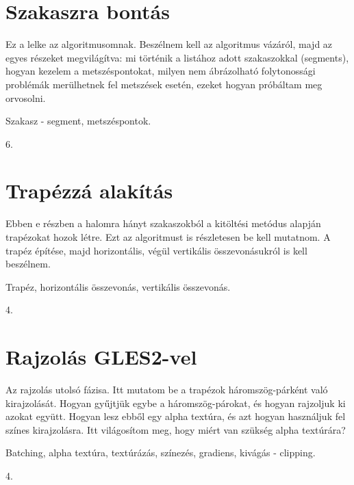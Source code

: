 \documentclass[12pt]{report}
\theoremstyle{definition}
\begin{document}
  \section{Szakaszra bontás}

Ez a lelke az algoritmusomnak. Beszélnem kell az algoritmus vázáról, majd
az egyes részeket megvilágítva: mi történik a listához adott
szakaszokkal (segments), hogyan kezelem a metszéspontokat, milyen nem
ábrázolható folytonossági problémák merülhetnek fel metszések
esetén, ezeket hogyan próbáltam meg orvosolni.

  \begin{description}[noitemsep]
    \item[Kulcsszavak] Szakasz - segment, metszéspontok.
    \item[Becsült oldalszám] 6.
  \end{description}

  \section{Trapézzá alakítás}

Ebben e részben a halomra hányt szakaszokból a kitöltési metódus
alapján trapézokat hozok létre. Ezt az algoritmust is részletesen be kell
mutatnom. A trapéz építése, majd horizontális, végül vertikális
összevonásukról is kell beszélnem.

  \begin{description}[noitemsep]
    \item[Kulcsszavak] Trapéz, horizontális összevonás, vertikális összevonás.
    \item[Becsült oldalszám] 4.
  \end{description}

  \section{Rajzolás GLES2-vel}

Az rajzolás utolsó fázisa. Itt mutatom be a trapézok
háromszög-párként való kirajzolását. Hogyan gyűjtjük egybe a
háromszög-párokat, és hogyan rajzoljuk ki azokat együtt. Hogyan lesz
ebből egy alpha textúra, és azt hogyan használjuk fel színes
kirajzolásra. Itt világosítom meg, hogy miért van szükség alpha textúrára?

  \begin{description}[noitemsep]
    \item[Kulcsszavak] Batching, alpha textúra, textúrázás, színezés,
    gradiens, kivágás - clipping.
    \item[Becsült oldalszám] 4.
  \end{description}
\end{document}
